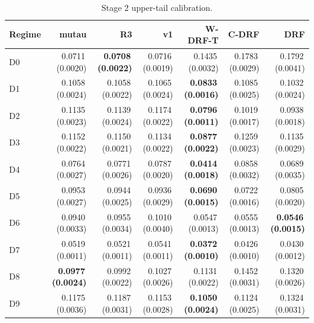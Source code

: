 \begin{table}[htbp]
\centering
\caption{Stage 2 upper-tail calibration.}
\label{tab:p55s2-tail}
\scriptsize
\setlength{\tabcolsep}{3.2pt}
\begin{tabular}{@{}lrrrrrr@{}}
\toprule
Regime & mutau & R3 & v1 & W-DRF-T & C-DRF & DRF \\
\midrule
D0 & 0.0711\,(0.0020) & \textbf{0.0708\,(0.0022)} & 0.0716\,(0.0019) & 0.1435\,(0.0032) & 0.1783\,(0.0029) & 0.1792\,(0.0041) \\
D1 & 0.1058\,(0.0024) & 0.1058\,(0.0022) & 0.1065\,(0.0024) & \textbf{0.0833\,(0.0016)} & 0.1085\,(0.0025) & 0.1032\,(0.0024) \\
D2 & 0.1135\,(0.0023) & 0.1139\,(0.0024) & 0.1174\,(0.0022) & \textbf{0.0796\,(0.0011)} & 0.1019\,(0.0017) & 0.0938\,(0.0018) \\
D3 & 0.1152\,(0.0022) & 0.1150\,(0.0021) & 0.1134\,(0.0022) & \textbf{0.0877\,(0.0022)} & 0.1259\,(0.0023) & 0.1135\,(0.0029) \\
D4 & 0.0764\,(0.0027) & 0.0771\,(0.0026) & 0.0787\,(0.0020) & \textbf{0.0414\,(0.0018)} & 0.0858\,(0.0032) & 0.0689\,(0.0035) \\
D5 & 0.0953\,(0.0027) & 0.0944\,(0.0025) & 0.0936\,(0.0029) & \textbf{0.0690\,(0.0015)} & 0.0722\,(0.0016) & 0.0805\,(0.0020) \\
D6 & 0.0940\,(0.0033) & 0.0955\,(0.0034) & 0.1010\,(0.0040) & 0.0547\,(0.0013) & 0.0555\,(0.0013) & \textbf{0.0546\,(0.0015)} \\
D7 & 0.0519\,(0.0011) & 0.0521\,(0.0011) & 0.0541\,(0.0011) & \textbf{0.0372\,(0.0010)} & 0.0426\,(0.0010) & 0.0430\,(0.0012) \\
D8 & \textbf{0.0977\,(0.0024)} & 0.0992\,(0.0022) & 0.1027\,(0.0026) & 0.1131\,(0.0022) & 0.1452\,(0.0031) & 0.1320\,(0.0026) \\
D9 & 0.1175\,(0.0036) & 0.1187\,(0.0031) & 0.1153\,(0.0028) & \textbf{0.1050\,(0.0024)} & 0.1124\,(0.0025) & 0.1324\,(0.0031) \\
\bottomrule
\end{tabular}
\end{table}

